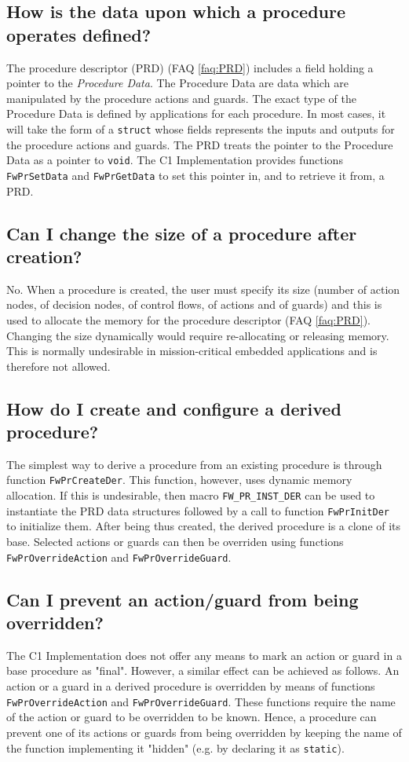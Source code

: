 \documentclass[faq]{../fwprofile}
\begin{document}
\subsection{How is the data upon which a procedure operates defined?}\label{faq:procedure_data}
The procedure descriptor (PRD) (FAQ \ref{faq:PRD}) includes a field holding a pointer to the \emph{Procedure Data}. The Procedure Data are data which are manipulated 
by the procedure actions and guards. The exact type of the Procedure Data is defined by applications for each procedure. In most cases, it will take 
the form of a \texttt{struct} whose fields represents the inputs and outputs for the procedure actions and guards. The PRD treats the pointer to 
the Procedure Data as a pointer to \texttt{void}. The C1 Implementation provides functions \texttt{FwPrSetData} and \texttt{FwPrGetData} to set 
this pointer in, and to retrieve it from, a PRD.

\subsection{Can I change the size of a procedure after creation?}
No. When a procedure is created, the user must specify its size (number of action nodes, of decision nodes, of control flows, of actions and of guards) 
and this is used to allocate the memory for the procedure descriptor (FAQ \ref{faq:PRD}). Changing the size dynamically would require re-allocating or 
releasing memory. This is normally undesirable in mission-critical embedded applications and is therefore not allowed. 

\subsection{How do I create and configure a derived procedure?}
The simplest way to derive a procedure from an existing procedure is through function \texttt{FwPrCreateDer}. This function, however, 
uses dynamic memory allocation. If this is undesirable, then macro \texttt{FW\_PR\_INST\_DER} can be used to instantiate the PRD data structures 
followed by a call to function \texttt{FwPrInitDer} to initialize them. After being thus created, the derived procedure is a clone of its base. 
Selected actions or guards can then be overriden using functions \texttt{FwPrOverrideAction} and \texttt{FwPrOverrideGuard}.

\subsection{Can I prevent an action/guard from being overridden?}
The C1 Implementation does not offer any means to mark an action or guard in a base procedure as "final". However, a similar effect can be achieved 
as follows. An action or a guard in a derived procedure is overridden by means of functions \texttt{FwPrOverrideAction} and \texttt{FwPrOverrideGuard}. 
These functions require the name of the action or guard to be overridden to be known. Hence, a procedure can prevent one of its actions or guards 
from being overridden by keeping the name of the function implementing it "hidden" (e.g. by declaring it as \texttt{static}).
\end{document}
